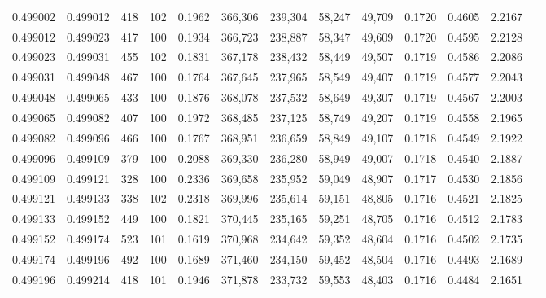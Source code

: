 \begin{tabular}{rrrrrrrrrrrrr}
0.499002 & 0.499012 &   418 & 102 &                                     0.1962 & 366,306 & 239,304 &  58,247 &  49,709 & 0.1720 & 0.4605 & 2.2167 \\
0.499012 & 0.499023 &   417 & 100 &                                     0.1934 & 366,723 & 238,887 &  58,347 &  49,609 & 0.1720 & 0.4595 & 2.2128 \\
0.499023 & 0.499031 &   455 & 102 &                                     0.1831 & 367,178 & 238,432 &  58,449 &  49,507 & 0.1719 & 0.4586 & 2.2086 \\
0.499031 & 0.499048 &   467 & 100 &                                     0.1764 & 367,645 & 237,965 &  58,549 &  49,407 & 0.1719 & 0.4577 & 2.2043 \\
0.499048 & 0.499065 &   433 & 100 &                                     0.1876 & 368,078 & 237,532 &  58,649 &  49,307 & 0.1719 & 0.4567 & 2.2003 \\
0.499065 & 0.499082 &   407 & 100 &                                     0.1972 & 368,485 & 237,125 &  58,749 &  49,207 & 0.1719 & 0.4558 & 2.1965 \\
0.499082 & 0.499096 &   466 & 100 &                                     0.1767 & 368,951 & 236,659 &  58,849 &  49,107 & 0.1718 & 0.4549 & 2.1922 \\
0.499096 & 0.499109 &   379 & 100 &                                     0.2088 & 369,330 & 236,280 &  58,949 &  49,007 & 0.1718 & 0.4540 & 2.1887 \\
0.499109 & 0.499121 &   328 & 100 &                                     0.2336 & 369,658 & 235,952 &  59,049 &  48,907 & 0.1717 & 0.4530 & 2.1856 \\
0.499121 & 0.499133 &   338 & 102 &                                     0.2318 & 369,996 & 235,614 &  59,151 &  48,805 & 0.1716 & 0.4521 & 2.1825 \\
0.499133 & 0.499152 &   449 & 100 &                                     0.1821 & 370,445 & 235,165 &  59,251 &  48,705 & 0.1716 & 0.4512 & 2.1783 \\
0.499152 & 0.499174 &   523 & 101 &                                     0.1619 & 370,968 & 234,642 &  59,352 &  48,604 & 0.1716 & 0.4502 & 2.1735 \\
0.499174 & 0.499196 &   492 & 100 &                                     0.1689 & 371,460 & 234,150 &  59,452 &  48,504 & 0.1716 & 0.4493 & 2.1689 \\
0.499196 & 0.499214 &   418 & 101 &                                     0.1946 & 371,878 & 233,732 &  59,553 &  48,403 & 0.1716 & 0.4484 & 2.1651 \\

\end{tabular}
